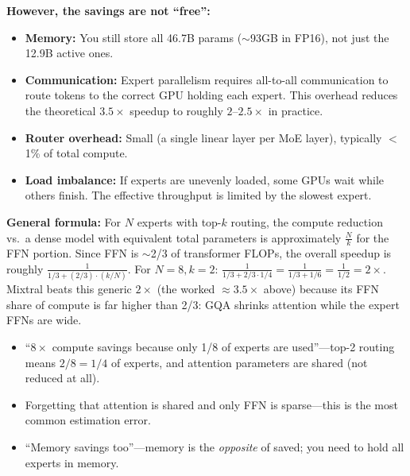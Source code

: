 \begin{interviewq}
\textbf{However, the savings are not ``free'':}
\begin{itemize}
    \item \textbf{Memory:} You still store all 46.7B params ($\sim$93GB in FP16), not just the 12.9B active ones.
    \item \textbf{Communication:} Expert parallelism requires all-to-all communication to route tokens to the correct GPU holding each expert. This overhead reduces the theoretical $3.5\times$ speedup to roughly $2$--$2.5\times$ in practice.
    \item \textbf{Router overhead:} Small (a single linear layer per MoE layer), typically $<$1\% of total compute.
    \item \textbf{Load imbalance:} If experts are unevenly loaded, some GPUs wait while others finish. The effective throughput is limited by the slowest expert.
\end{itemize}

\textbf{General formula:} For $N$ experts with top-$k$ routing, the compute reduction vs.\ a dense model with equivalent total parameters is approximately $\frac{N}{k}$ for the FFN portion. Since FFN is $\sim$2/3 of transformer FLOPs, the overall speedup is roughly $\frac{1}{1/3 + (2/3) \cdot (k/N)}$. For $N=8, k=2$: $\frac{1}{1/3 + 2/3 \cdot 1/4} = \frac{1}{1/3 + 1/6} = \frac{1}{1/2} = 2\times$. Mixtral beats this generic $2\times$ (the worked $\approx 3.5\times$ above) because its FFN share of compute is far higher than 2/3: GQA shrinks attention while the expert FFNs are wide.

\redflags
\begin{itemize}
    \item ``$8\times$ compute savings because only 1/8 of experts are used''---top-2 routing means $2/8 = 1/4$ of experts, and attention parameters are shared (not reduced at all).
    \item Forgetting that attention is shared and only FFN is sparse---this is the most common estimation error.
    \item ``Memory savings too''---memory is the \textit{opposite} of saved; you need to hold all experts in memory.
\end{itemize}



\end{interviewq}
